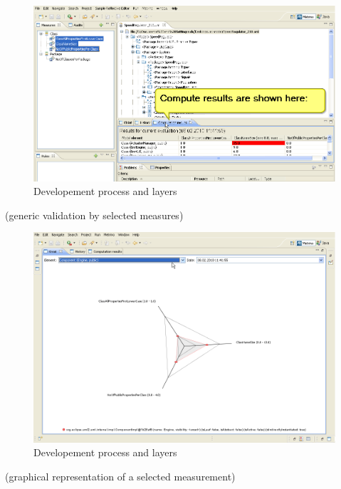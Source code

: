 \begin{figure}[h]
	\centering
		\includegraphics[width=\textwidth]{metrino_screen_1}
	\caption{Developement process and layers}
	\label{fig:sonarrunning}
\end{figure}

(generic validation by selected measures)

\begin{figure}[h]
	\centering
		\includegraphics[width=\textwidth]{metrino_screen_2}
	\caption{Developement process and layers}
	\label{fig:sonarrunning}
\end{figure}

(graphical representation of a selected measurement)


